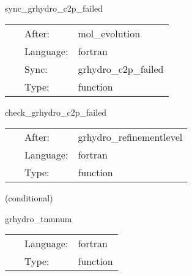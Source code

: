 \vspace{5mm}


\hspace{5mm} sync\_grhydro\_c2p\_failed 

\hspace{5mm}{\it syncronise the mask function that contains the points where c2p has failed } 


\hspace{5mm}

 \begin{tabular*}{160mm}{cll} 
~ & After:  & mol\_evolution \\ 
~ & Language:  & fortran \\ 
~ & Sync:  & grhydro\_c2p\_failed \\ 
~ & Type:  & function \\ 
\end{tabular*} 


\vspace{5mm}


\hspace{5mm} check\_grhydro\_c2p\_failed 

\hspace{5mm}{\it check the mask function that contains the points where c2p has failed and report an error in case a failure is found } 


\hspace{5mm}

 \begin{tabular*}{160mm}{cll} 
~ & After:  & grhydro\_refinementlevel \\ 
~ & Language:  & fortran \\ 
~ & Type:  & function \\ 
\end{tabular*} 


\vspace{5mm}

   (conditional) 

\hspace{5mm} grhydro\_tmunum 

\hspace{5mm}{\it compute the energy-momentum tensor - mhd version } 


\hspace{5mm}

 \begin{tabular*}{160mm}{cll} 
~ & Language:  & fortran \\ 
~ & Type:  & function \\ 
\end{tabular*} 


